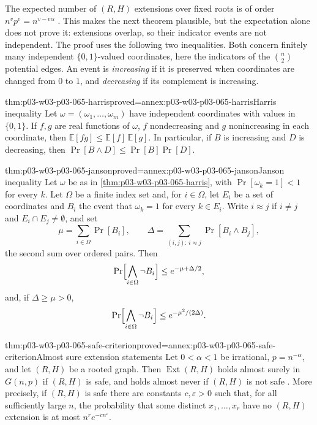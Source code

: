 The expected number of \((R,H)\) extensions over fixed roots is of order
\(n^vp^e=n^{v-e\alpha}\) \cite[p.~7]{Spencer2007LogicRandomStructuresAuthor}.  This makes
the next theorem plausible, but the expectation alone does not prove it:
extensions overlap, so their indicator events are not independent.  The
proof uses the following two inequalities.  Both concern finitely many
independent \(\{0,1\}\)-valued coordinates, here the indicators of the
\(\binom n2\) potential edges.  An event is \emph{increasing} if it is
preserved when coordinates are changed from \(0\) to \(1\), and
\emph{decreasing} if its complement is increasing.

\begin{hblemma}{thm:p03-w03-p03-065-harris}{proved=annex:p03-w03-p03-065-harris}{Harris inequality}
Let \(\omega=(\omega_1,\ldots,\omega_m)\) have independent coordinates with
values in \(\{0,1\}\).  If \(f,g\) are real functions of \(\omega\), \(f\)
nondecreasing and \(g\) nonincreasing in each coordinate, then
\(\mathbb E[fg]\leq\mathbb E[f]\,\mathbb E[g]\).  In particular, if \(B\) is
increasing and \(D\) is decreasing, then \(\Pr[B\wedge D]\leq\Pr[B]\Pr[D]\).
\end{hblemma}

\begin{hblemma}{thm:p03-w03-p03-065-janson}{proved=annex:p03-w03-p03-065-janson}{Janson inequality}
Let \(\omega\) be as in \cref{thm:p03-w03-p03-065-harris}, with
\(\Pr[\omega_k=1]<1\) for every \(k\).  Let \(\Omega\) be a finite index
set and, for \(i\in\Omega\), let \(E_i\) be a set of coordinates and \(B_i\)
the event that \(\omega_k=1\) for every \(k\in E_i\).  Write \(i\approx j\)
if \(i\neq j\) and \(E_i\cap E_j\neq\emptyset\), and set
\[
  \mu=\sum_{i\in\Omega}\Pr[B_i],\qquad
  \Delta=\sum_{(i,j):\,i\approx j}\Pr[B_i\wedge B_j],
\]
the second sum over ordered pairs.  Then
\[
  \Pr\Bigl[\bigwedge_{i\in\Omega}\neg B_i\Bigr]\leq e^{-\mu+\Delta/2},
\]
and, if \(\Delta\geq\mu>0\),
\[
  \Pr\Bigl[\bigwedge_{i\in\Omega}\neg B_i\Bigr]\leq e^{-\mu^2/(2\Delta)}.
\]
\end{hblemma}

\begin{hbtheorem}{thm:p03-w03-p03-065-safe-criterion}{proved=annex:p03-w03-p03-065-safe-criterion}{Almost sure extension statements}
Let \(0<\alpha<1\) be irrational, \(p=n^{-\alpha}\), and let \((R,H)\) be a
rooted graph.  Then \(\operatorname{Ext}(R,H)\) holds almost surely in
\(G(n,p)\) if \((R,H)\) is safe, and holds almost never if \((R,H)\) is not
safe \cite[p.~7]{Spencer2007LogicRandomStructuresAuthor}.  More precisely, if \((R,H)\) is
safe there are constants \(c,\varepsilon>0\) such that, for all sufficiently
large \(n\), the probability that some distinct \(x_1,\ldots,x_r\) have no
\((R,H)\) extension is at most \(n^re^{-cn^{\varepsilon}}\).
\end{hbtheorem}

